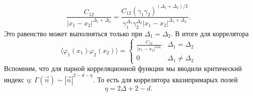 \documentclass[a4paper,12pt]{article}
\theoremstyle{definition}
\theoremstyle{definition}
\theoremstyle{definition}
\begin{document}
\begin{equation}
  \label{eq:189}
  \frac{C_{12}}{\left|x_{1}-x_{2}\right|^{\Delta_{1}+\Delta_{2}}}=\frac{C_{12}(\gamma_{1}\gamma_{2})^{(\Delta_{1}+\Delta_{2})/2}}{\gamma_{1}^{\Delta_{1}}\gamma_{2}^{\Delta_{2}} \left|x_{1}-x_{2}\right|^{\Delta_1+\Delta_2}}.
\end{equation}
Это равенство может выполняться только при $\Delta_{1}=\Delta_{2}$. В итоге для коррелятора
\begin{equation}
  \label{eq:190}
   \langle \varphi_{1}(x_{1}) \varphi_{2}(x_{2})\rangle =
   \begin{cases}
     \frac{C_{12}}{\left|x_{1}-x_{2}\right|^{2\Delta_{1}}} & \Delta_{1}=\Delta_{2}\\
     0 & \Delta_{1}\neq \Delta_{2}
   \end{cases}
\end{equation}
Вспомним, что для парной корреляционной функции мы вводили критический индекс $\eta$: $\Gamma(\vec n)\sim |\vec n|^{2-d-\eta}$. То есть для коррелятора квазипримарых полей
\begin{equation}
  \label{eq:191}
  \eta=2\Delta +2 -d.
\end{equation}
\end{document}
